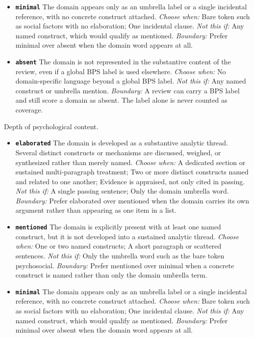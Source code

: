 \documentclass[11pt]{article}
\begin{document}
\begin{description}
\begin{itemize}[leftmargin=1.3em,itemsep=2pt,topsep=2pt]
  \item \textbf{\texttt{minimal}} The domain appears only as an umbrella label or a single incidental reference, with no concrete construct attached. {\small \textit{Choose when:} Bare token such as social factors with no elaboration; One incidental clause. \textit{Not this if:} Any named construct, which would qualify as mentioned. \textit{Boundary:} Prefer minimal over absent when the domain word appears at all.}
  \item \textbf{\texttt{absent}} The domain is not represented in the substantive content of the review, even if a global BPS label is used elsewhere. {\small \textit{Choose when:} No domain-specific language beyond a global BPS label. \textit{Not this if:} Any named construct or umbrella mention. \textit{Boundary:} A review can carry a BPS label and still score a domain as absent. The label alone is never counted as coverage.}
  \end{itemize}
\item[\texttt{domain\_coverage\_psych}] Depth of psychological content.
  \begin{itemize}[leftmargin=1.3em,itemsep=2pt,topsep=2pt]
  \item \textbf{\texttt{elaborated}} The domain is developed as a substantive analytic thread. Several distinct constructs or mechanisms are discussed, weighed, or synthesized rather than merely named. {\small \textit{Choose when:} A dedicated section or sustained multi-paragraph treatment; Two or more distinct constructs named and related to one another; Evidence is appraised, not only cited in passing. \textit{Not this if:} A single passing sentence; Only the domain umbrella word. \textit{Boundary:} Prefer elaborated over mentioned when the domain carries its own argument rather than appearing as one item in a list.}
  \item \textbf{\texttt{mentioned}} The domain is explicitly present with at least one named construct, but it is not developed into a sustained analytic thread. {\small \textit{Choose when:} One or two named constructs; A short paragraph or scattered sentences. \textit{Not this if:} Only the umbrella word such as the bare token psychosocial. \textit{Boundary:} Prefer mentioned over minimal when a concrete construct is named rather than only the domain umbrella term.}
  \item \textbf{\texttt{minimal}} The domain appears only as an umbrella label or a single incidental reference, with no concrete construct attached. {\small \textit{Choose when:} Bare token such as social factors with no elaboration; One incidental clause. \textit{Not this if:} Any named construct, which would qualify as mentioned. \textit{Boundary:} Prefer minimal over absent when the domain word appears at all.}

\end{itemize}
\end{description}
\end{document}
